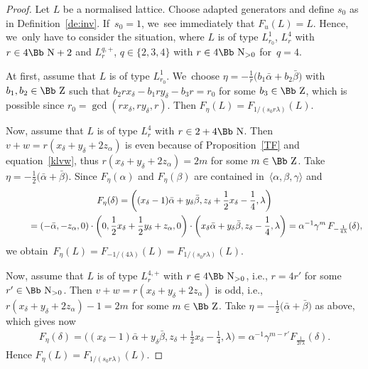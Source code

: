 \documentclass[10pt,a4paper]{amsart}
\newcommand\NN{{\mbox{\Bb N}}}
\newcommand\ZZ{{\mbox{\Bb Z}}}
\newcommand\la{\langle}
\newcommand\ra{\rangle}
\numberwithin{equation}{section}
\begin{document}
\begin{proof}
Let $L$ be a normalised lattice. Choose adapted generators and define $s_0$ as in Definition~\ref{de:inv}. If~$s_0=1$, we~see immediately that $F_u(L)=L$.
Hence, we~only have to consider the situation, where $L$ is of type $L^1_{r_0}$, $L^4_r$ with $r\in4\NN+2$ and $L^{q,+}_r$, $q\in\{2,3,4\}$ with $r\in4\NN_{>0}$ for~$q=4$.

At first, assume that $L$ is of type $L^1_{r_0}$. We~choose $\eta=-\frac1r\big({b_1}\bar\alpha+{b_2}\bar\beta\big)$ with $b_1,b_2\in\ZZ$ such that $b_2rx_\delta-b_1ry_\delta-b_3r=r_0$ for some $b_3\in\ZZ$, which is possible since $r_0=\gcd(rx_\delta,ry_\delta,r)$.
Then $F_\eta(L)=F_{1/(s_0r\lambda)}(L)$.

Now, assume that $L$ is of type $L^4_{r}$ with $r\in 2+4\NN$.
Then $v+w=r(x_\delta+y_\delta+2z_\alpha)$ is even because of Proposition~\ref{TF} and equation~\eqref{klvw}, thus $r(x_\delta+y_\delta+2z_\alpha)=2m$ for some $m\in\ZZ$.
Take $\eta=-\frac{1}{2}\big(\bar\alpha+\bar\beta\big)$.
Since $F_\eta(\alpha)$ and $F_\eta(\beta)$ are contained in~$\la \alpha,\beta,\gamma\ra$ and{\samepage
\begin{gather*}
F_\eta(\delta)= \bigg((x_\delta-1)\bar\alpha+y_\delta\bar\beta, z_\delta+\frac12 x_\delta -\frac14,\lambda\bigg)
\\ \hphantom{F_\eta(\delta)}
{}=(-\bar\alpha,-z_\alpha,0)\cdot \bigg(0,\frac12 x_\delta+\frac12 y_\delta+z_\alpha,0\bigg)\cdot \bigg(x_\delta\bar\alpha+y_\delta\bar\beta,z_\delta-\frac14,\lambda\bigg)
=\alpha^{-1}\gamma^m\,F_{-\frac1{4\lambda}}(\delta),
\end{gather*}
we obtain~$F_\eta(L)=F_{-1/(4\lambda)}(L)=F_{1/(s_0r\lambda)}(L)$.}

Now, assume that $L$ is of type $L^{4,+}_{r}$ with $r\in 4\NN_{>0}$, i.e., $r=4r'$ for some $r'\in\NN_{>0}$.
Then $v+w=r(x_\delta+y_\delta+2z_\alpha)$ is odd, i.e., $r(x_\delta+y_\delta+2z_\alpha)-1=2m$ for some $m\in\ZZ$.
Take $\eta=-\frac{1}{2}\big(\bar\alpha+\bar\beta\big)$ as above,
which gives now
\begin{gather*}
F_\eta(\delta)= \bigg((x_\delta-1)\bar\alpha+y_\delta\bar\beta, z_\delta+\frac12 x_\delta -\frac14,\lambda\bigg) = \alpha^{-1}\gamma^{m-r'} F_\frac1{2r\lambda}(\delta).
\end{gather*}
Hence $F_\eta(L)=F_{1/(s_0r\lambda)}(L)$.


\end{proof}
\end{document}
